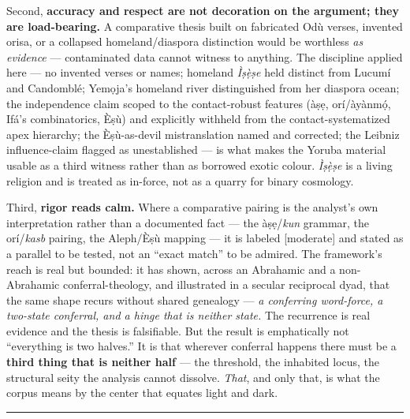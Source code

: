 \documentclass[11pt]{article}
\begin{document}
Second, \textbf{accuracy and respect are not decoration on the argument; they are load-bearing.} A comparative thesis built on fabricated Odù verses, invented orisa, or a collapsed homeland/\allowbreak{}diaspora distinction would be worthless \emph{as evidence} — contaminated data cannot witness to anything. The discipline applied here — no invented verses or names; homeland \emph{Ìṣẹ̀ṣe} held distinct from Lucumí and Candomblé; Yemọja's homeland river distinguished from her diaspora ocean; the independence claim scoped to the contact-robust features (àṣẹ, orí/\allowbreak{}àyànmọ́, Ifá's combinatorics, Èṣù) and explicitly withheld from the contact-systematized apex hierarchy; the Èṣù-as-devil mistranslation named and corrected; the Leibniz influence-claim flagged as unestablished — is what makes the Yoruba material usable as a third witness rather than as borrowed exotic colour. \emph{Ìṣẹ̀ṣe} is a living religion and is treated as in-force, not as a quarry for binary cosmology.

Third, \textbf{rigor reads calm.} Where a comparative pairing is the analyst's own interpretation rather than a documented fact — the àṣẹ/\allowbreak{}\emph{kun} grammar, the orí/\allowbreak{}\emph{kasb} pairing, the Aleph/\allowbreak{}Èṣù mapping — it is labeled [moderate] and stated as a parallel to be tested, not an ``exact match'' to be admired. The framework's reach is real but bounded: it has shown, across an Abrahamic and a non-Abrahamic conferral-theology, and illustrated in a secular reciprocal dyad, that the same shape recurs without shared genealogy — \emph{a conferring word-force, a two-state conferral, and a hinge that is neither state.} The recurrence is real evidence and the thesis is falsifiable. But the result is emphatically not ``everything is two halves.'' It is that wherever conferral happens there must be a \textbf{third thing that is neither half} — the threshold, the inhabited locus, the structural seity the analysis cannot dissolve. \emph{That}, and only that, is what the corpus means by the center that equates light and dark.

\medskip\noindent\rule{\linewidth}{0.3pt}\medskip
\end{document}
